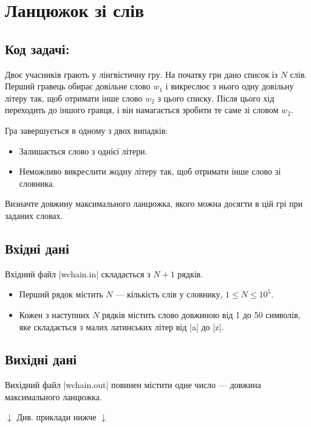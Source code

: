 \documentclass[12pt,a4paper]{article}
\begin{document}
\section*{Ланцюжок зі слів \hfill {}}


\subsection*{Код задачі: }

Двоє учасників грають у лінгвістичну гру.
На початку гри дано список із \(N\) слів. Перший гравець обирає довільне слово \(w_1\) і викреслює з нього одну довільну літеру так, щоб отримати інше слово \(w_2\) з цього списку. Після цього хід переходить до іншого гравця, і він намагається зробити те саме зі словом \(w_2\).

Гра завершується в одному з двох випадків:

\begin{itemize}
    \item Залишається слово з однієї літери.
    \item Неможливо викреслити жодну літеру так, щоб отримати інше слово зі словника.
\end{itemize}

Визначте довжину максимального ланцюжка, якого можна досягти в цій грі при заданих словах.


\subsection*{Вхідні дані}

Вхідний файл |wchain.in| складається з \(N + 1\) рядків.
\begin{itemize}
    \item Перший рядок містить \(N\) --- кількість слів у словнику, \(1 \leq N \leq 10^5\).
    \item Кожен з наступних \(N\) рядків містить слово довжиною від 1 до 50 символів, яке складається з малих латинських літер від |a| до |z|.
\end{itemize}


\subsection*{Вихідні дані}

Вихідний файл |wchain.out| повинен містити одне число --- довжина максимального ланцюжка.


\begin{pagebottomtext}
$\downarrow$ Див. приклади нижче $\downarrow$
\end{pagebottomtext}
\end{document}
